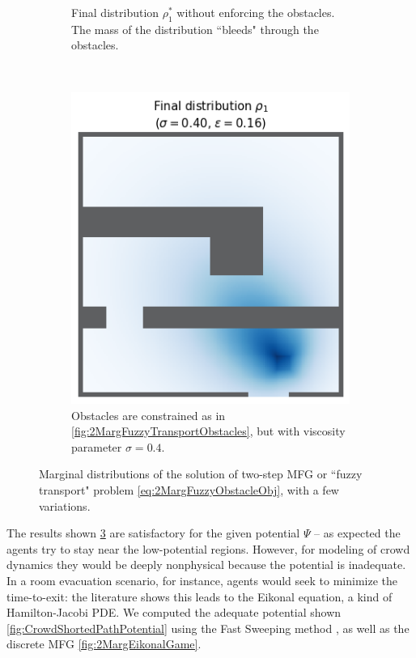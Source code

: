 \documentclass[../report.tex]{subfiles}
\begin{document}
\begin{figure}
\begin{subfigure}[t]{.4\linewidth}
	\caption{Final distribution $\rho^*_1$ without enforcing the obstacles. The mass of the distribution ``bleeds" through the obstacles. }\label{fig:2MargFuzzyTransportRelaxedObst}
	\end{subfigure}~
	\begin{subfigure}[t]{.4\linewidth}
	\centering
	\includegraphics[width=\linewidth]{../project/images/fuzzy_transport_lowvisc.png}
	\caption{Obstacles are constrained as in \cref{fig:2MargFuzzyTransportObstacles}, but with viscosity parameter $\sigma=0.4$.}\label{fig:2MargFuzzyTransportLowVisc}
	\end{subfigure}
	\caption{Marginal distributions of the solution of two-step MFG or ``fuzzy transport" problem \eqref{eq:2MargFuzzyObstacleObj}, with a few variations.}\label{fig:2MargFuzzyTransportMarginals}
\end{figure}



\begin{remark}\label{rmk:SmartPotential} The results shown \cref{fig:2MargFuzzyTransportMarginals} are satisfactory for the given potential $\Psi$ -- as expected the agents try to stay near the low-potential regions. However, for modeling of crowd dynamics they would be deeply nonphysical because the potential is inadequate. In a room evacuation scenario, for instance, agents would seek to minimize the time-to-exit: the literature shows this leads to the Eikonal equation, a kind of Hamilton-Jacobi PDE. We computed the adequate potential shown \cref{fig:CrowdShortedPathPotential} using the Fast Sweeping method \parencite{Zhao2004AFS}, as well as the discrete MFG \cref{fig:2MargEikonalGame}.
\end{remark}
\end{document}
